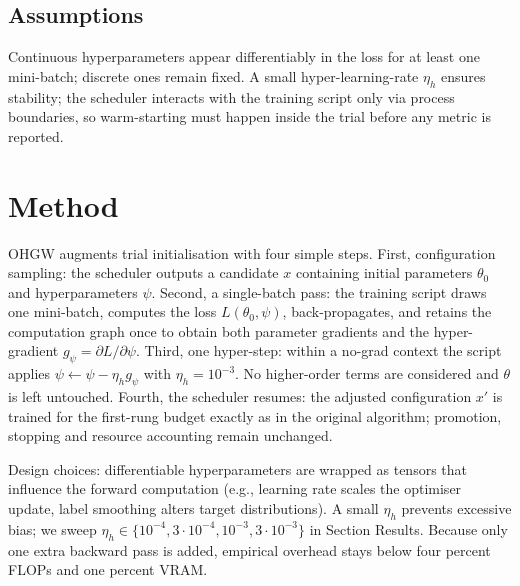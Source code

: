 \documentclass{article}
\begin{document}
\subsection{Assumptions}
Continuous hyperparameters appear differentiably in the loss for at least one mini-batch; discrete ones remain fixed. A small hyper-learning-rate \(\eta_h\) ensures stability; the scheduler interacts with the training script only via process boundaries, so warm-starting must happen inside the trial before any metric is reported.

\section{Method}
OHGW augments trial initialisation with four simple steps. First, configuration sampling: the scheduler outputs a candidate \(x\) containing initial parameters \(\theta_0\) and hyperparameters \(\psi\). Second, a single-batch pass: the training script draws one mini-batch, computes the loss \(L(\theta_0,\psi)\), back-propagates, and retains the computation graph once to obtain both parameter gradients and the hyper-gradient \(g_{\psi} = \partial L/\partial \psi\). Third, one hyper-step: within a no-grad context the script applies \(\psi \leftarrow \psi - \eta_h g_{\psi}\) with \(\eta_h = 10^{-3}\). No higher-order terms are considered and \(\theta\) is left untouched. Fourth, the scheduler resumes: the adjusted configuration \(x'\) is trained for the first-rung budget exactly as in the original algorithm; promotion, stopping and resource accounting remain unchanged.

Design choices: differentiable hyperparameters are wrapped as tensors that influence the forward computation (e.g., learning rate scales the optimiser update, label smoothing alters target distributions). A small \(\eta_h\) prevents excessive bias; we sweep \(\eta_h\in\{10^{-4}, 3\cdot 10^{-4}, 10^{-3}, 3\cdot 10^{-3}\}\) in Section Results. Because only one extra backward pass is added, empirical overhead stays below four percent FLOPs and one percent VRAM.
\end{document}
